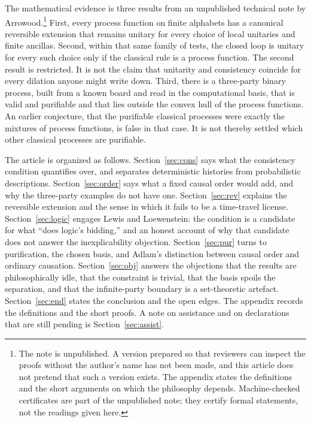 \documentclass[11pt]{article}
\begin{document}
The mathematical evidence is three results from an unpublished technical note by Arrowood.\footnote{The note is unpublished. A version prepared so that reviewers can inspect the proofs without the author's name has not been made, and this article does not pretend that such a version exists. The appendix states the definitions and the short arguments on which the philosophy depends. Machine-checked certificates are part of the unpublished note; they certify formal statements, not the readings given here.} First, every process function on finite alphabets has a canonical reversible extension that remains unitary for every choice of local unitaries and finite ancillas. Second, within that same family of tests, the closed loop is unitary for every such choice only if the classical rule is a process function. The second result is restricted. It is not the claim that unitarity and consistency coincide for every dilation anyone might write down. Third, there is a three-party binary process, built from a known board and read in the computational basis, that is valid and purifiable and that lies outside the convex hull of the process functions. An earlier conjecture, that the purifiable classical processes were exactly the mixtures of process functions, is false in that case. It is not thereby settled which other classical processes are purifiable.

The article is organized as follows. Section~\ref{sec:cons} says what the consistency condition quantifies over, and separates deterministic histories from probabilistic descriptions. Section~\ref{sec:order} says what a fixed causal order would add, and why the three-party examples do not have one. Section~\ref{sec:rev} explains the reversible extension and the sense in which it fails to be a time-travel license. Section~\ref{sec:logic} engages Lewis and Loewenstein: the condition is a candidate for what ``does logic's bidding,'' and an honest account of why that candidate does not answer the inexplicability objection. Section~\ref{sec:pur} turns to purification, the chosen basis, and Adlam's distinction between causal order and ordinary causation. Section~\ref{sec:obj} answers the objections that the results are philosophically idle, that the constraint is trivial, that the basis spoils the separation, and that the infinite-party boundary is a set-theoretic artefact. Section~\ref{sec:end} states the conclusion and the open edges. The appendix records the definitions and the short proofs. A note on assistance and on declarations that are still pending is Section~\ref{sec:assist}.
\end{document}
